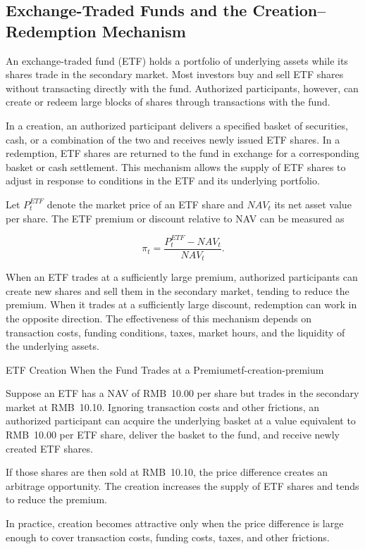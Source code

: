 \subsection[Exchange-Traded Funds and the Creation--Redemption Mechanism]{Exchange-Traded Funds and the Creation--\\Redemption Mechanism}

An exchange-traded fund (ETF) holds a portfolio of underlying assets while its shares trade in the secondary market. Most investors buy and sell ETF shares without transacting directly with the fund. Authorized participants, however, can create or redeem large blocks of shares through transactions with the fund.

In a creation, an authorized participant delivers a specified basket of securities, cash, or a combination of the two and receives newly issued ETF shares. In a redemption, ETF shares are returned to the fund in exchange for a corresponding basket or cash settlement. This mechanism allows the supply of ETF shares to adjust in response to conditions in the ETF and its underlying portfolio.

Let $P_t^{ETF}$ denote the market price of an ETF share and $\textit{NAV}_t$ its net asset value per share. The ETF premium or discount relative to NAV can be measured as

\begin{equation}
\pi_t=
\frac{P_t^{ETF}-\textit{NAV}_t}{\textit{NAV}_t}.
\label{eq:ch14-etf-premium-discount}
\end{equation}

When an ETF trades at a sufficiently large premium, authorized participants can create new shares and sell them in the secondary market, tending to reduce the premium. When it trades at a sufficiently large discount, redemption can work in the opposite direction. The effectiveness of this mechanism depends on transaction costs, funding conditions, taxes, market hours, and the liquidity of the underlying assets.

\begin{example}{ETF Creation When the Fund Trades at a Premium}{etf-creation-premium}

Suppose an ETF has a NAV of RMB~10.00 per share but trades in the secondary market at RMB~10.10. Ignoring transaction costs and other frictions, an authorized participant can acquire the underlying basket at a value equivalent to RMB~10.00 per ETF share, deliver the basket to the fund, and receive newly created ETF shares.

If those shares are then sold at RMB~10.10, the price difference creates an arbitrage opportunity. The creation increases the supply of ETF shares and tends to reduce the premium.

In practice, creation becomes attractive only when the price difference is large enough to cover transaction costs, funding costs, taxes, and other frictions.

\end{example}


